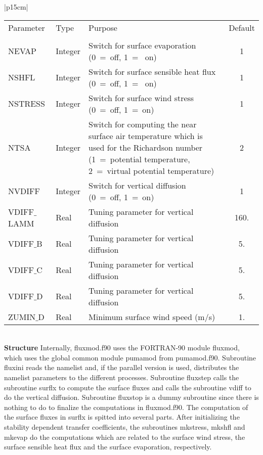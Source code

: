 \begin{center}
\begin{tabular}{|p{15cm}|}
\begin{center}
\begin{tabular}{l l p{7cm} c}  %
Parameter & Type & Purpose & Default \\
&&&\\
NEVAP & Integer & Switch for surface evaporation (0~=~off, 1~=~ on) & 1 \\
NSHFL & Integer &Switch for surface sensible heat flux (0~=~off, 1~=~ on) & 1 \\
NSTRESS & Integer & Switch for surface wind stress (0~=~off, 1~=~on) & 1 \\
NTSA & Integer & Switch for computing the near surface air temperature which is used for the
Richardson number (1~=~potential temperature, 2~=~virtual potential temperature)& 2 \\
NVDIFF & Integer & Switch for vertical diffusion (0~=~off, 1~=~on) & 1 \\
VDIFF$\_$LAMM & Real & Tuning parameter for vertical diffusion & 160. \\
VDIFF$\_$B & Real &Tuning parameter for vertical diffusion & 5. \\
VDIFF$\_$C & Real &Tuning parameter for vertical diffusion & 5. \\
VDIFF$\_$D & Real &Tuning parameter for vertical diffusion & 5. \\
ZUMIN$\_$D & Real &Minimum surface wind speed (m/s) & 1. \\
\end{tabular} 
\end{center}
\vspace{3mm} \\
\hline
\vspace{2mm} {\bf Structure} Internally, {\module fluxmod.f90} uses the FORTRAN-90
module {\modu fluxmod}, which uses the global common module {\modu pumamod} from
{\module pumamod.f90}. Subroutine {\sub fluxini} reads the namelist and, if the parallel
version
is used,  distributes the namelist parameters to the different processes. Subroutine {\sub
fluxstep}
calls the subroutine {\sub surflx} to compute the surface fluxes and calls the subroutine {\sub
vdiff} to do the vertical diffusion. Subroutine {\sub fluxstop} is a dummy subroutine since there
is nothing to do to finalize the computations in {\module fluxmod.f90}. The computation of the
surface fluxes in {\sub surflx} is spitted into several parts. After initializing the stability
dependent transfer coefficients, the subroutines {\sub mkstress}, {\sub mkshfl} and {\sub
mkevap} do the computations which are related to the surface wind stress, the surface sensible
heat flux and the surface evaporation, respectively. \vspace{3mm} \\
\hline
\end{tabular}
\end{center}
\newpage

